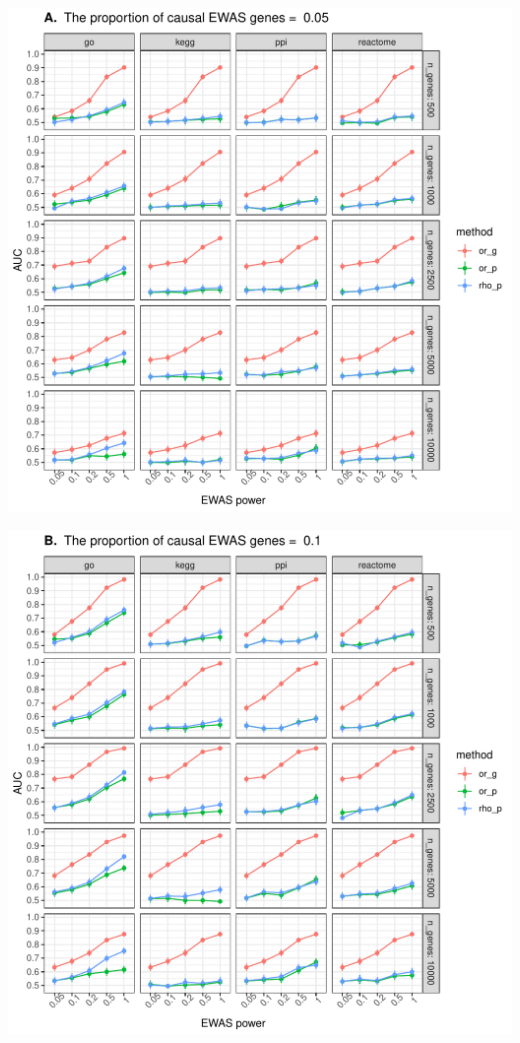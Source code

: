 \documentclass[11pt,oneside]{bristolthesis}
\begin{document}
\begin{center}\includegraphics[width=1\linewidth]{figure/06-ewas_gwas_comparison/method_test_gene_up_all/PEC_0.05} \end{center}
\begin{center}\includegraphics[width=1\linewidth]{figure/06-ewas_gwas_comparison/method_test_gene_up_all/PEC_0.1} \end{center}
\end{document}
